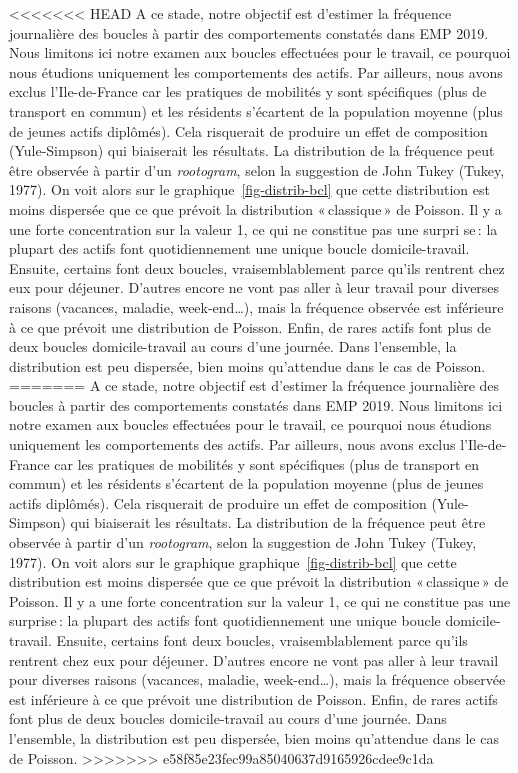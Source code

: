 \documentclass[
  9pt,
  a4paper,
  DIV=11]{scrreprt}
\begin{document}
\textless\textless\textless\textless\textless\textless\textless{} HEAD A
ce stade, notre objectif est d'estimer la fréquence journalière des
boucles à partir des comportements constatés dans EMP 2019. Nous
limitons ici notre examen aux boucles effectuées pour le travail, ce
pourquoi nous étudions uniquement les comportements des actifs. Par
ailleurs, nous avons exclus l'Ile-de-France car les pratiques de
mobilités y sont spécifiques (plus de transport en commun) et les
résidents s'écartent de la population moyenne (plus de jeunes actifs
diplômés). Cela risquerait de produire un effet de composition
(Yule-Simpson) qui biaiserait les résultats. La distribution de la
fréquence peut être observée à partir d'un \emph{rootogram}, selon la
suggestion de John Tukey (Tukey, 1977). On voit alors sur le
graphique~\ref{fig-distrib-bcl} que cette distribution est moins
dispersée que ce que prévoit la distribution «\,classique\,» de Poisson.
Il y a une forte concentration sur la valeur 1, ce qui ne constitue pas
une surpri se\,: la plupart des actifs font quotidiennement une unique
boucle domicile-travail. Ensuite, certains font deux boucles,
vraisemblablement parce qu'ils rentrent chez eux pour déjeuner. D'autres
encore ne vont pas aller à leur travail pour diverses raisons (vacances,
maladie, week-end\ldots), mais la fréquence observée est inférieure à ce
que prévoit une distribution de Poisson. Enfin, de rares actifs font
plus de deux boucles domicile-travail au cours d'une journée. Dans
l'ensemble, la distribution est peu dispersée, bien moins qu'attendue
dans le cas de Poisson. ======= A ce stade, notre objectif est d'estimer
la fréquence journalière des boucles à partir des comportements
constatés dans EMP 2019. Nous limitons ici notre examen aux boucles
effectuées pour le travail, ce pourquoi nous étudions uniquement les
comportements des actifs. Par ailleurs, nous avons exclus
l'Ile-de-France car les pratiques de mobilités y sont spécifiques (plus
de transport en commun) et les résidents s'écartent de la population
moyenne (plus de jeunes actifs diplômés). Cela risquerait de produire un
effet de composition (Yule-Simpson) qui biaiserait les résultats. La
distribution de la fréquence peut être observée à partir d'un
\emph{rootogram}, selon la suggestion de John Tukey (Tukey, 1977). On
voit alors sur le graphique graphique~\ref{fig-distrib-bcl} que cette
distribution est moins dispersée que ce que prévoit la distribution
«\,classique\,» de Poisson. Il y a une forte concentration sur la valeur
1, ce qui ne constitue pas une surprise\,: la plupart des actifs font
quotidiennement une unique boucle domicile-travail. Ensuite, certains
font deux boucles, vraisemblablement parce qu'ils rentrent chez eux pour
déjeuner. D'autres encore ne vont pas aller à leur travail pour diverses
raisons (vacances, maladie, week-end\ldots), mais la fréquence observée
est inférieure à ce que prévoit une distribution de Poisson. Enfin, de
rares actifs font plus de deux boucles domicile-travail au cours d'une
journée. Dans l'ensemble, la distribution est peu dispersée, bien moins
qu'attendue dans le cas de Poisson.
\textgreater\textgreater\textgreater\textgreater\textgreater\textgreater\textgreater{}
e58f85e23fec99a85040637d9165926cdee9c1da
\end{document}
